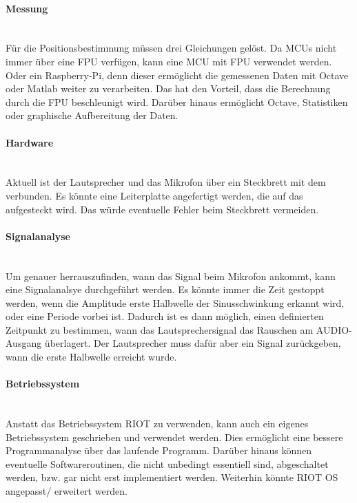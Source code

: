 \paragraph{Messung}\mbox{}\\
Für die Positionsbestimmung müssen drei Gleichungen gelöst. Da MCUs nicht immer über eine FPU verfügen, kann eine MCU mit FPU verwendet werden. Oder ein Raspberry-Pi, denn dieser ermöglicht die gemessenen Daten mit Octave oder Matlab weiter zu verarbeiten. Das hat den Vorteil, dass die Berechnung durch die FPU beschleunigt wird. Darüber hinaus ermöglicht Octave, Statistiken oder graphische Aufbereitung der Daten.

\paragraph{Hardware}\mbox{}\\
Aktuell ist der Lautsprecher und das Mikrofon über ein Steckbrett mit dem \board \platz verbunden. Es könnte eine Leiterplatte angefertigt werden, die auf das \board \platz aufgesteckt wird. Das würde eventuelle Fehler beim Steckbrett vermeiden.  

\paragraph{Signalanalyse}\mbox{}\\
Um genauer herrauszufinden, wann das Signal beim Mikrofon ankommt, kann eine Signalanalsye durchgeführt werden. Es könnte immer die Zeit gestoppt werden, wenn die Amplitude erste Halbwelle der Sinusschwinkung erkannt wird, oder eine Periode vorbei ist. Dadurch ist es dann möglich, einen definierten Zeitpunkt zu bestimmen, wann das Lautsprechersignal das Rauschen am \si{AUDIO}-Ausgang überlagert. Der Lautsprecher muss dafür aber ein Signal zurückgeben, wann die erste Halbwelle erreicht wurde.

\paragraph{Betriebssystem}\mbox{}\\
Anstatt das Betriebssystem RIOT zu verwenden, kann auch ein eigenes Betriebssystem geschrieben und verwendet werden. Dies ermöglicht eine bessere Programmanalyse über das laufende Programm. Darüber hinaus können eventuelle Softwareroutinen, die nicht unbedingt essentiell sind, abgeschaltet werden, bzw. gar nicht erst implementiert werden. Weiterhin könnte RIOT OS angepasst/ erweitert werden.






